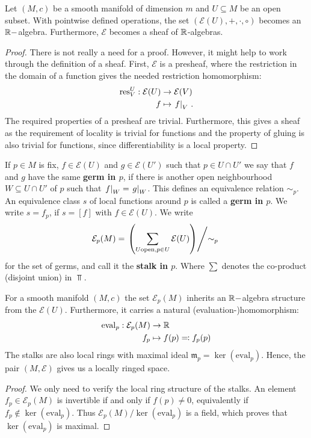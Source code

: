 \begin{corollary}
	Let $(M,c)$ be a smooth manifold of dimension $m$ and $U\subseteq M$ be an open subset. With pointwise defined operations, the set $(\mathcal{E}(U),+,\cdot,\circ)$ becomes an $\mathbb{R}-$algebra. Furthermore, $\mathcal{E}$ becomes a sheaf of $\mathbb{R}$-algebras.
\end{corollary}
\begin{proof}
	There is not really a need for a proof. However, it might help to work through the definition of a sheaf. First, $\mathcal{E}$ is a presheaf, where the restriction in the domain of a function gives the needed restriction homomorphism:
	\begin{align*}
		\text{res}^U_V: \mathcal{E}(U) &\to \mathcal{E}(V) \\
		f &\mapsto \left.f\right|_{V} \, .
	\end{align*} The required properties of a presheaf are trivial. Furthermore, this gives a sheaf as the requirement of locality is trivial for functions and the property of gluing is also trivial for functions, since differentiability is a local property.
\end{proof}
\begin{definition}
	If $p\in M$ is fix, $f\in \mathcal{E}(U)$ and $g\in \mathcal{E}(U')$ such that $p\in U\cap U'$ we say that $f$ and $g$ have the same \textbf{germ in $p$}, if there is another open neighbourhood $W\subseteq U\cap U'$ of $p$ such that $\left.f\right|_{W}=\left.g\right|_{W}$. This defines an equivalence relation $\sim_p$. An equivalence class $s$ of local functions around $p$ is called a \textbf{germ in $p$}. We write $s=f_p$, if $s=[f]$ with $f\in \mathcal{E}(U)$. 
	We write 
	\begin{align*}
		\mathcal{E}_p(M)=\left. \left( \sum_{U \text{open},p\in U }\mathcal{E}(U)\right)\middle/ \sim_p \right. \, 
	\end{align*} for the set of germs, and call it the \textbf{stalk in $p$}. Where $\sum$ denotes the co-product (disjoint union) in $\Top$.
\end{definition}
\begin{corollary}
	For a smooth manifold $(M,c)$ the set $\mathcal{E}_p(M)$ inherits an $\mathbb{R}-$algebra structure from the $\mathcal{E}(U)$. Furthermore, it carries a natural (evaluation-)homomorphism:
	\begin{align*}
		\mathrm{eval}_p: \mathcal{E}_p(M) & \to \mathbb{R} \\
		f_p  & \mapsto f(p)\eqcolon f_p(p)
	\end{align*}
	The stalks are also local rings with maximal ideal $\mathfrak{m}_p=\ker(\mathrm{eval}_p)$. Hence, the pair $(M,\mathcal{E})$ gives us a locally ringed space.
\end{corollary}
\begin{proof}
	We only need to verify the local ring structure of the stalks. An element $f_p\in \mathcal{E}_p(M)$ is invertible if and only if $f(p)\neq 0$, equivalently if $f_p\notin \ker(\mathrm{eval}_p)$. Thus $\mathcal{E}_p(M) \big/ \ker(\mathrm{eval}_p)$ is a field, which proves that $\ker(\mathrm{eval}_p)$ is maximal.
\end{proof}



